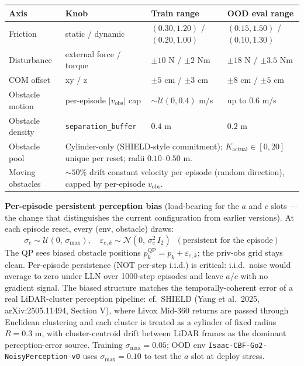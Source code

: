 \documentclass[11pt]{article}
\begin{document}
\begin{small}
\begin{tabularx}{\linewidth}{@{}lXll@{}}
\toprule
Axis             & Knob                                  & Train range                      & OOD eval range \\
\midrule
Friction         & static / dynamic                      & $(0.30, 1.20)$ / $(0.20, 1.00)$  & $(0.15, 1.50)$ / $(0.10, 1.30)$ \\
Disturbance      & external force / torque               & $\pm 10$ N / $\pm 2$ Nm          & $\pm 18$ N / $\pm 3.5$ Nm \\
COM offset       & xy / z                                & $\pm 5$ cm / $\pm 3$ cm          & $\pm 8$ cm / $\pm 5$ cm \\
Obstacle motion  & per-episode $\lvert v_{\text{obs}}\rvert$ cap & $\sim\mathcal{U}(0, 0.4)$ m/s & up to $0.6$ m/s \\
Obstacle density & \texttt{separation\_buffer}           & $0.4$ m                          & $0.2$ m \\
Obstacle pool    & \multicolumn{3}{l}{Cylinder-only (SHIELD-style commitment); $K_{\text{actual}} \in [0, 20]$ unique per reset; radii $0.10$--$0.50$ m.} \\
Moving obstacles & \multicolumn{3}{l}{$\sim 50\%$ drift constant velocity per episode (random direction), capped by per-episode $v_{\text{obs}}$.} \\
\bottomrule
\end{tabularx}
\end{small}

\noindent
\textbf{Per-episode persistent perception bias} (load-bearing for the $a$ and
$c$ slots --- the change that distinguishes the current configuration from
earlier versions). At each episode reset, every (env, obstacle) draws:
\[
  \sigma_e \sim \mathcal{U}(0,\,\sigma_{\max}),
  \quad \varepsilon_{e,k} \sim \mathcal{N}(0,\,\sigma_e^{2}\,I_2)
  \;\;(\text{persistent for the episode})
\]
The QP sees biased obstacle positions $p_k^{\text{QP}} = p_k +
\varepsilon_{e,k}$; the priv-obs grid stays clean. Per-episode persistence
(NOT per-step i.i.d.) is critical: i.i.d.\ noise would average to zero under
LLN over 1000-step episodes and leave $a$/$c$ with no gradient signal. The
biased structure matches the temporally-coherent error of a real
LiDAR-cluster perception pipeline: cf.\ SHIELD (Yang et al.\ 2025,
arXiv:2505.11494, Section V), where Livox Mid-360 returns are passed
through Euclidean clustering and each cluster is treated as a cylinder
of fixed radius $R = 0.3$ m, with cluster-centroid drift between LiDAR
frames as the dominant perception-error source. Training
$\sigma_{\max} = 0.05$; OOD env \texttt{Isaac-CBF-Go2-NoisyPerception-v0}
uses $\sigma_{\max} = 0.10$ to test the $a$ slot at deploy stress.
\end{document}
